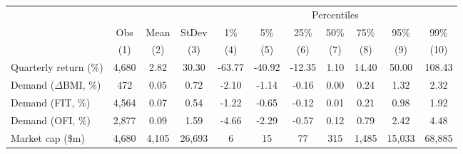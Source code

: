 \begin{tabular}{lcccccccccc}
  \hline & & & & \multicolumn{7}{c}{Percentiles} \\
   \cmidrule(l){5-11}
 & Obs & Mean & StDev & 1\% & 5\% & 25\% & 50\% & 75\% & 95\% & 99\% \\ 
   \cmidrule(l){2-4}
 \cmidrule(l){5-11}
 & (1) & (2) & (3) & (4) & (5) & (6) & (7) & (8) & (9) & (10) \\ 
  Quarterly return (\%) & 4,680 & 2.82 & 30.30 & -63.77 & -40.92 & -12.35 & 1.10 & 14.40 & 50.00 & 108.43 \\ 
  Demand ($\Delta$BMI, \%) & 472 & 0.05 & 0.72 & -2.10 & -1.14 & -0.16 & 0.00 & 0.24 & 1.32 & 2.32 \\ 
  Demand (FIT, \%) & 4,564 & 0.07 & 0.54 & -1.22 & -0.65 & -0.12 & 0.01 & 0.21 & 0.98 & 1.92 \\ 
  Demand (OFI, \%) & 2,877 & 0.09 & 1.59 & -4.66 & -2.29 & -0.57 & 0.12 & 0.79 & 2.42 & 4.48 \\ 
  Market cap (\$m) & 4,680 & 4,105 & 26,693 & 6 & 15 & 77 & 315 & 1,485 & 15,033 & 68,885 \\ 
   \hline 
\end{tabular}
